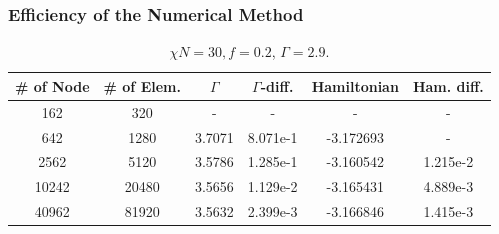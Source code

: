 \documentclass[notheorems,serif]{beamer}
\begin{document}
\begin{frame}
\frametitle{Efficiency of the Numerical Method}

\begin{table}[H]
\caption{
$\chi N=30,f=0.2$, $\Gamma=2.9$.}
  \label{tab:refinemesh}
  \centering
\small
\begin{tabular}{|c|c|c|c|c|c|}
 \hline
 \# of Node  & \# of Elem. & $\Gamma$ & $\Gamma$-diff. & Hamiltonian &
 Ham. diff. \\
 \hline
162  & 320   & -  & - & -&  -  \\ 
 \hline
 642   & 1280  & 3.7071  & 8.071e-1 & -3.172693  & - \\
 \hline
2562  & 5120  & 3.5786  & 1.285e-1 & -3.160542 &  1.215e-2\\
 \hline
10242 & 20480 & 3.5656  & 1.129e-2 & -3.165431 & 4.889e-3\\
 \hline
40962 & 81920 & 3.5632  & 2.399e-3 & -3.166846 & 1.415e-3 \\
 \hline
\end{tabular}
\end{table}


\end{frame}
\end{document}
